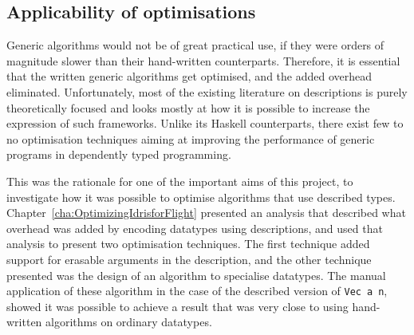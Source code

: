 \documentclass{ituthesis}
\newcommand{\tttype}[1]{\textcolor{type-color}{\texttt{#1}}}
\newcommand{\ttvar}[1]{\textcolor{local-var-color}{\texttt{#1}}}
\theoremstyle{break}
\begin{document}


\subsection{Applicability of optimisations}
\label{sub:Applicabilityofoptimisations}
Generic algorithms would not be of great practical use, if they were orders of magnitude slower than their hand-written counterparts.
Therefore, it is essential that the written generic algorithms get optimised, and the added overhead eliminated.
Unfortunately, most of the existing literature on descriptions is purely theoretically focused and looks mostly at how it is possible to increase the expression of such frameworks.
Unlike its Haskell counterparts, there exist few to no optimisation techniques aiming at improving the performance of generic programs in dependently typed programming.

This was the rationale for one of the important aims of this project, to investigate how it was possible to optimise algorithms that use described types.
Chapter~\ref{cha:OptimizingIdrisforFlight} presented an analysis that described what overhead was added by encoding datatypes using descriptions, and used that analysis to present two optimisation techniques.
The first technique added support for erasable arguments in the description, and the other technique presented was the design of an algorithm to specialise datatypes.
The manual application of these algorithm in the case of the described version of \tttype{Vec}~\ttvar{a}~\ttvar{n}, showed it was possible to achieve a result that was very close to using hand-written algorithms on ordinary datatypes.
\end{document}
